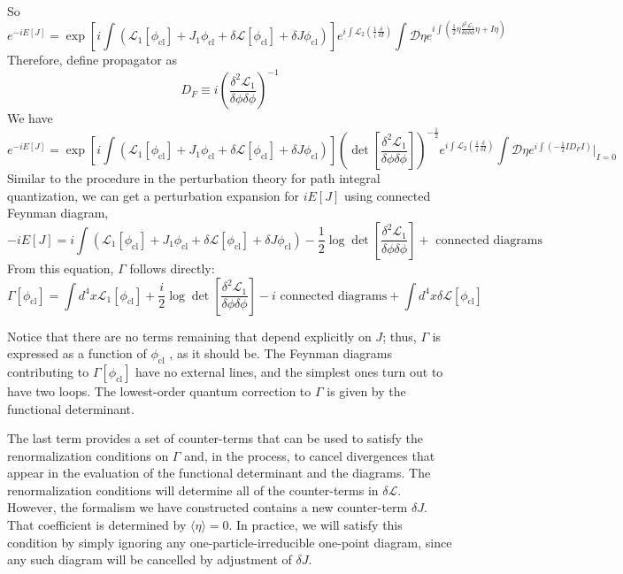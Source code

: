 So
\[e^{-iE[J]} = \exp \left[ i \int ( \mathcal{L}_1 [\phi_{\mathrm{cl}}] + J_1\phi_{\mathrm{cl}} + \delta \mathcal{L}[\phi_{\mathrm{cl}}] + \delta J \phi_{\mathrm{cl}} )\right] e^{i\int \mathcal{L}_2(\frac{1}{i} \frac{\delta}{\delta I})} \int \mathcal{D}\eta e^{i\int \left(\frac{1}{2} \eta \frac{\delta^2 \mathcal{L}_1}{\delta \phi \delta \phi} \eta + I\eta \right)}\]
Therefore, define propagator as
\[D_F \equiv i \left( \frac{\delta^2 \mathcal{L}_1}{\delta \phi \delta \phi}\right)^{-1}\]
We have
\[e^{-iE[J]} = \exp \left[ i \int ( \mathcal{L}_1 [\phi_{\mathrm{cl}}] + J_1\phi_{\mathrm{cl}} + \delta \mathcal{L}[\phi_{\mathrm{cl}}] + \delta J \phi_{\mathrm{cl}} )\right] \left( \det \left[  \frac{\delta^2 \mathcal{L}_1}{\delta \phi \delta \phi} \right] \right) ^{-\frac{1}{2}} e^{i\int \mathcal{L}_2(\frac{1}{i} \frac{\delta}{\delta I})} \int \mathcal{D}\eta e^{i\int \left(-\frac{1}{2} I D_F I \right)} |_{I=0}\]
Similar to the procedure in the perturbation theory for path integral quantization, we can get a perturbation expansion for $iE[J]$ using connected Feynman diagram,
\[-iE[J] = i \int ( \mathcal{L}_1 [\phi_{\mathrm{cl}}] + J_1\phi_{\mathrm{cl}} + \delta \mathcal{L}[\phi_{\mathrm{cl}}] + \delta J \phi_{\mathrm{cl}} ) - \frac{1}{2} \log \det \left[  \frac{\delta^2 \mathcal{L}_1}{\delta \phi \delta \phi} \right] + \mbox{ connected diagrams }\]
From this equation, $\Gamma$ follows directly:
\[\Gamma[\phi_{\mathrm{cl}}] = \int d^4x \mathcal{L}_1[\phi_{\mathrm{cl}}] + \frac{i}{2} \log \det \left[  \frac{\delta^2 \mathcal{L}_1}{\delta \phi \delta \phi} \right] -i \mbox{ connected diagrams} + \int d^4x \delta\mathcal{L}[\phi_{\mathrm{cl}}]\]

Notice that there are no terms remaining that depend explicitly on $J$; thus, $\Gamma$ is expressed as a function of $\phi_{\mathrm{cl}}$ , as it should be. The Feynman diagrams contributing to $\Gamma[\phi_{\mathrm{cl}}]$ have no external lines, and the simplest ones turn out to have two loops. The lowest-order quantum correction to $\Gamma$ is given by the
functional determinant.

The last term provides a set of counter-terms that can be used
to satisfy the renormalization conditions on $\Gamma$ and, in the process, to cancel divergences that appear in the evaluation of the functional determinant and the diagrams. The renormalization conditions will determine all of the counter-terms in $\delta \mathcal{L}$. However, the formalism we have constructed contains a new counter-term $\delta J$. That coefficient is determined by  $\langle \eta \rangle = 0$. In practice, we will satisfy this condition by simply ignoring any one-particle-irreducible one-point diagram, since any such diagram will be cancelled by adjustment of $\delta J$. 

